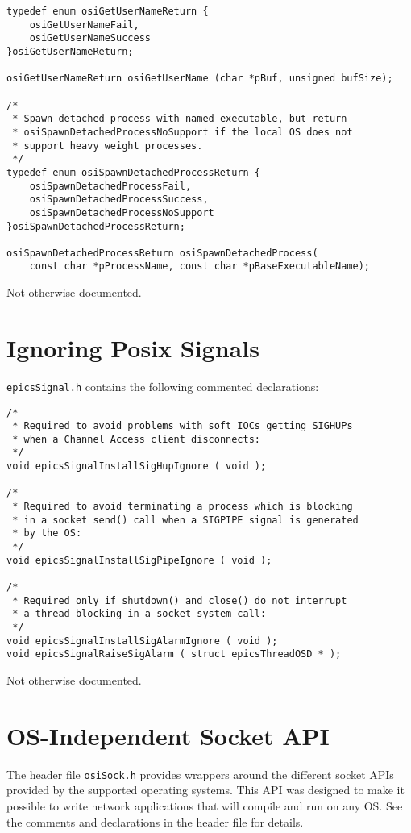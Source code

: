 \begin{verbatim}
typedef enum osiGetUserNameReturn {
    osiGetUserNameFail,
    osiGetUserNameSuccess
}osiGetUserNameReturn;

osiGetUserNameReturn osiGetUserName (char *pBuf, unsigned bufSize);

/*
 * Spawn detached process with named executable, but return
 * osiSpawnDetachedProcessNoSupport if the local OS does not
 * support heavy weight processes.
 */
typedef enum osiSpawnDetachedProcessReturn {
    osiSpawnDetachedProcessFail,
    osiSpawnDetachedProcessSuccess,
    osiSpawnDetachedProcessNoSupport
}osiSpawnDetachedProcessReturn;

osiSpawnDetachedProcessReturn osiSpawnDetachedProcess(
    const char *pProcessName, const char *pBaseExecutableName);

\end{verbatim}

Not otherwise documented.

\section{Ignoring Posix Signals}

\verb|epicsSignal.h| contains the following commented declarations:

\begin{verbatim}
/*
 * Required to avoid problems with soft IOCs getting SIGHUPs
 * when a Channel Access client disconnects:
 */
void epicsSignalInstallSigHupIgnore ( void );

/*
 * Required to avoid terminating a process which is blocking
 * in a socket send() call when a SIGPIPE signal is generated
 * by the OS:
 */
void epicsSignalInstallSigPipeIgnore ( void );

/*
 * Required only if shutdown() and close() do not interrupt
 * a thread blocking in a socket system call:
 */
void epicsSignalInstallSigAlarmIgnore ( void );
void epicsSignalRaiseSigAlarm ( struct epicsThreadOSD * );
\end{verbatim}

Not otherwise documented.

\section{OS-Independent Socket API}

The header file \verb|osiSock.h| provides wrappers around the different socket APIs provided by the supported operating systems.
This API was designed to make it possible to write network applications that will compile and run on any OS.
See the comments and declarations in the header file for details.


